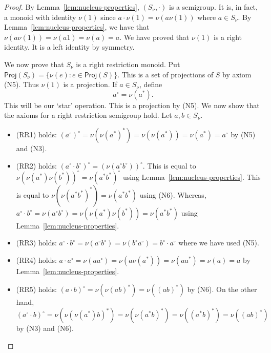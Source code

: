 \documentclass[10pt,a4paper]{amsart}
\begin{document}
\begin{proof} By Lemma~\ref{lem:nucleus-properties}, $(S_{\nu},\cdot)$ is a semigroup.
It is, in fact, a monoid with identity $\nu (1)$
since
$a \cdot \nu (1) = \nu (a \nu (1))$
where $a \in S_{\nu}$.
By Lemma~\ref{lem:nucleus-properties},
we have that $\nu (a \nu (1)) = \nu (a1) = \nu (a) = a$.
We have proved that $\nu(1)$ is a right identity.
It is a left identity by symmetry.

We now prove that $S_{\nu}$ is a right restriction monoid.
Put $\mathsf{Proj} (S_{\nu}) = \{\nu (e) \colon e \in \mathsf{Proj}(S)\}$.
This is a set of projections of $S$ by axiom (N5).
Thus $\nu (1)$ is a projection.
If $a \in S_{\nu}$, define 
$$a^{\circ} = \nu (a^{\ast}).$$
This will be our `star' operation.
This is a projection by (N5).
We now show that the axioms for a right restriction semigroup hold.
Let $a,b \in S_{\nu}$.

\begin{itemize}

\item (RR1) holds:
$(a^{\circ})^{\circ} = \nu (\nu (a^{\ast})^{\ast}) = \nu (\nu (a^{\ast})) = \nu (a^{\ast}) = a^{\circ}$
by (N5) and (N3).

\item (RR2) holds: $(a^{\circ} \cdot b^{\circ})^{\circ} = (\nu(a^{\circ}b^{\circ}))^{\circ}$.
This is equal to $\nu (\nu(a^{\ast})\nu(b^{\ast}))^{\circ} = \nu (a^{\ast}b^{\ast})^{\circ}$ using Lemma~\ref{lem:nucleus-properties}.
This is equal to $\nu (\nu (a^{\ast}b^{\ast})^{\ast}) = \nu (a^{\ast}b^{\ast})$ using (N6).
Whereas, $a^{\circ} \cdot b^{\circ} = \nu (a^{\circ}b^{\circ}) = \nu (\nu (a^{\ast}) \nu (b^{\ast})) = \nu (a^{\ast}b^{\ast})$
using  Lemma~\ref{lem:nucleus-properties}.

\item (RR3) holds: $a^{\circ} \cdot b^{\circ} = \nu (a^{\circ}b^{\circ}) = \nu (b^{\circ}a^{\circ}) = b^{\circ} \cdot a^{\circ}$
where we have used (N5).

\item (RR4) holds: $a \cdot a^{\circ} = \nu (aa^{\circ}) = \nu (a\nu(a^{\ast})) = \nu (aa^{\ast}) = \nu (a) = a$ by Lemma~\ref{lem:nucleus-properties}.

\item (RR5) holds: $(a \cdot b)^{\circ} = \nu(\nu (ab)^{\ast}) = \nu ((ab)^{\ast})$ by (N6).
On the other hand, $(a^{\circ} \cdot b)^{\circ} = \nu ( \nu (\nu(a^{\ast})b)^{\ast}) = \nu (\nu (a^{\ast}b)^{\ast}) = \nu ((a^{\ast}b)^{\ast}) = \nu ((ab)^{\ast})$
by (N3) and (N6).


\end{itemize}
\end{proof}
\end{document}
